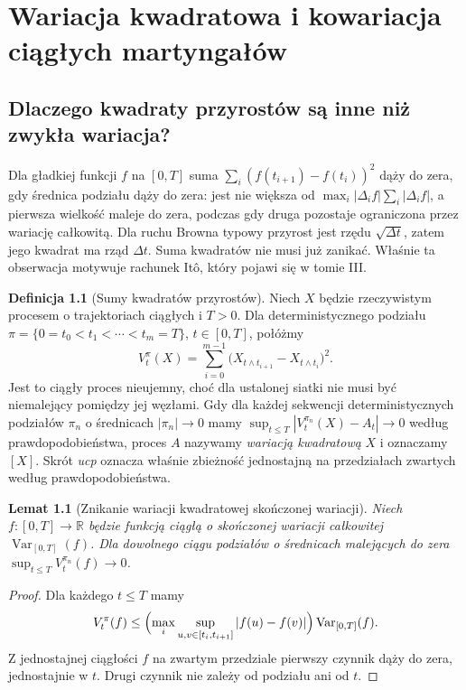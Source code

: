 \documentclass[11pt,a4paper,oneside]{report}
\numberwithin{equation}{chapter}
\theoremstyle{plain}
\newtheorem{lemat}[twierdzenie]{Lemat}
\theoremstyle{definition}
\newtheorem{definicja}{Definicja}[chapter]
\theoremstyle{remark}
\newcommand{\R}{\mathbb{R}}
\begin{document}
\chapter{Wariacja kwadratowa i kowariacja ciągłych martyngałów}
\label{ch:quadratic-cont}

\section{Dlaczego kwadraty przyrostów są inne niż zwykła wariacja?}
Dla gładkiej funkcji $f$ na $[0,T]$ suma
$\sum_i(f(t_{i+1})-f(t_i))^2$ dąży do zera, gdy
średnica podziału dąży do zera: jest nie większa od
$\max_i|\Delta_i f|\sum_i|\Delta_i f|$, a pierwsza
wielkość maleje do zera, podczas gdy druga pozostaje
ograniczona przez wariację całkowitą. Dla ruchu Browna
typowy przyrost jest rzędu $\sqrt{\Delta t}$, zatem
jego kwadrat ma rząd $\Delta t$. Suma kwadratów
nie musi już zanikać. Właśnie ta obserwacja motywuje
rachunek Itô, który pojawi się w tomie III.

\begin{definicja}[Sumy kwadratów przyrostów]
Niech $X$ będzie rzeczywistym procesem o trajektoriach
ciągłych i $T>0$. Dla deterministycznego podziału
$\pi=\{0=t_0<t_1<\cdots<t_m=T\}$, $t\in[0,T]$,
połóżmy
\[
V_t^\pi(X)=\sum_{i=0}^{m-1}
\bigl(X_{t\wedge t_{i+1}}-X_{t\wedge t_i}\bigr)^2.
\]
Jest to ciągły proces nieujemny, choć dla ustalonej
siatki nie musi być niemalejący pomiędzy jej węzłami.
Gdy dla każdej sekwencji deterministycznych podziałów
$\pi_n$ o średnicach $|\pi_n|\to0$ mamy
$\sup_{t\le T}|V_t^{\pi_n}(X)-A_t|\to0$
według prawdopodobieństwa, proces $A$ nazywamy
\emph{wariacją kwadratową} $X$ i oznaczamy $[X]$.
Skrót \emph{ucp} oznacza właśnie zbieżność jednostajną
na przedziałach zwartych według prawdopodobieństwa.
\end{definicja}

\begin{lemat}[Znikanie wariacji kwadratowej skończonej wariacji]
Niech $f:[0,T]\to\R$ będzie funkcją ciągłą o
skończonej wariacji całkowitej $\operatorname{Var}_{[0,T]}(f)$.
Dla dowolnego ciągu podziałów o średnicach malejących
do zera
$\sup_{t\le T}V_t^{\pi_n}(f)\to0$.
\end{lemat}
\begin{proof}
Dla każdego $t\le T$ mamy
\[
V_t^\pi(f)\le
\Bigl(\max_i\sup_{u,v\in[t_i,t_{i+1}]}|f(u)-f(v)|\Bigr)
\operatorname{Var}_{[0,T]}(f).
\]
Z jednostajnej ciągłości $f$ na zwartym przedziale
pierwszy czynnik dąży do zera, jednostajnie w $t$.
Drugi czynnik nie zależy od podziału ani od $t$.
\end{proof}
\end{document}
